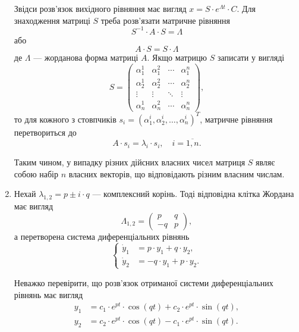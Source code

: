 \begin{enumerate}
Звідси розв’язок вихідного рівняння має вигляд $x = S \cdot e^{\Lambda t} \cdot C$. Для знаходження матриці $S$ треба розв’язати матричне рівняння
\begin{equation*}
	S^{-1} \cdot A \cdot S = \Lambda
\end{equation*}
або
\begin{equation*}
	A \cdot S = S \cdot \Lambda
\end{equation*}
де $\Lambda$ --- жорданова форма матриці $A$. Якщо матрицю $S$ записати у вигляді
\begin{equation*}
	S = 
	\begin{pmatrix} 
		\alpha_1^1 & \alpha_1^2 & \cdots & \alpha_1^n \\
		\alpha_2^1 & \alpha_2^2 & \cdots & \alpha_2^n \\
		\vdots & \vdots & \ddots & \vdots \\
		\alpha_n^1 & \alpha_n^2 & \cdots & \alpha_n^n
	\end{pmatrix},
\end{equation*}
то для кожного з стовпчиків $s_i = (\alpha_1^i, \alpha_2^i, \ldots, \alpha_n^i)^T$, матричне рівняння перетвориться до
\begin{equation*}
	A \cdot s_i = \lambda_i \cdot s_i, \quad i = \overline{1, n}.
\end{equation*}

Таким чином, у випадку різних дійсних власних чисел матриця $S$ являє собою набір $n$ власних векторів, що відповідають різним власним числам.

\item Нехай $\lambda_{1,2} = p \pm i \cdot q$ --- комплексний корінь. Тоді відповідна клітка Жордана має вигляд
\begin{equation*}
	\Lambda_{1,2} = \begin{pmatrix} p & q \\ -q & p \end{pmatrix},
\end{equation*}
а перетворена система диференціальних рівнянь
\begin{equation*}
	\left\{
		\begin{aligned}
			\dot y_1 &= p \cdot y_1 + q \cdot y_2, \\
			\dot y_2 &= - q \cdot y_1 + p \cdot y_2.
		\end{aligned}
	\right.
\end{equation*}

Неважко перевірити, що розв’язок отриманої системи диференціальних рівнянь має вигляд
\begin{align*}
	y_1 &= c_1 \cdot e^{pt} \cdot \cos (qt) + c_2 \cdot e^{pt} \cdot \sin(qt), \\
	y_2 &= c_2 \cdot e^{pt} \cdot \cos (qt) - c_1 \cdot e^{pt} \cdot \sin(qt).
\end{align*}


\end{enumerate}

